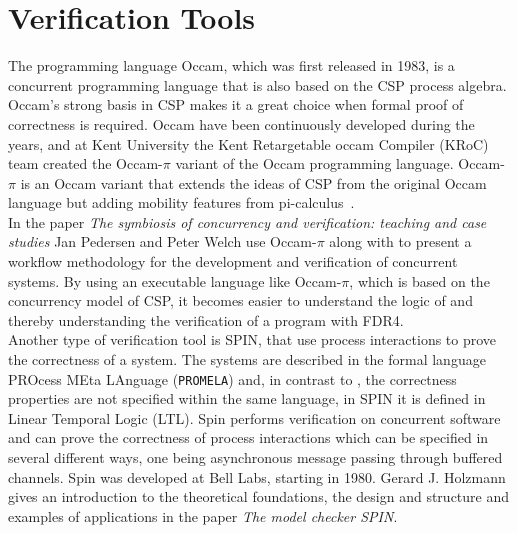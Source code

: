 \section{Verification Tools}
The programming language Occam\cite{Occam1995}, which was first released in 1983, is a concurrent programming language that is also based on the CSP process algebra. Occam's strong basis in CSP makes it a great choice when formal proof of correctness is required.
Occam have been continuously developed during the years, and at Kent University the Kent Retargetable occam Compiler (KRoC) team created the Occam-$\pi$\cite{UniveristyofKent} variant of the Occam programming language.
Occam-$\pi$ is an Occam variant that extends the ideas of CSP from the original Occam language but adding mobility features from pi-calculus~\cite{Milner1992}.
\\
In the paper \textit{The symbiosis of concurrency and verification: teaching and case studies}\cite{Pedersen2018} Jan Pedersen and Peter Welch use Occam-$\pi$ along with \cspm{} to present a workflow methodology for the development and verification of concurrent systems. By using an executable language like Occam-$\pi$, which is based on the concurrency model of CSP, it becomes easier to understand the logic of \cspm{} and thereby understanding the verification of a program with FDR4.\\

Another type of verification tool is SPIN\cite{spin}, that use process interactions to prove the correctness of a system. The systems are described in the formal language PROcess MEta LAnguage (\texttt{PROMELA})\cite{Holzmann1991} and, in contrast to \cspm, the correctness properties are not specified within the same language, in SPIN it is defined in Linear Temporal Logic (LTL)\cite{Pnueli1977}.
Spin performs verification on concurrent software and can prove the correctness of process interactions which can be specified in several different ways, one being asynchronous message passing through buffered channels.
Spin was developed at Bell Labs, starting in 1980. Gerard J. Holzmann gives an introduction to the theoretical foundations, the design and structure and examples of applications in the paper \textit{The model checker SPIN}\cite{Holzmann1997}.\\

